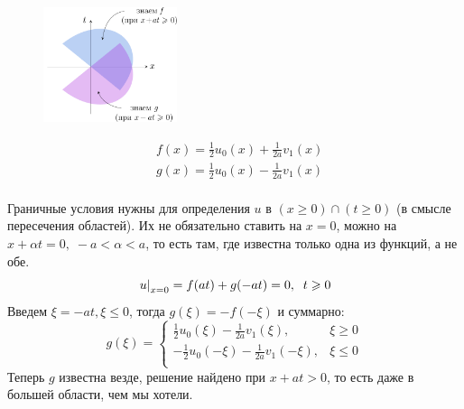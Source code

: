 \documentclass[../main.tex]{subfiles}
\begin{document}
\begin{figure}
    \centering
    \includegraphics[width=0.35\textwidth]{pic 4.pdf}
\end{figure}

\begin{align*}
    & f(x) = \frac{1}{2}u_0(x) + \frac{1}{2a}v_1(x) \\
    & g(x) = \frac{1}{2}u_0(x) - \frac{1}{2a}v_1(x) \\
\end{align*}

Граничные условия нужны для определения $u$ в $(x \geq 0)\cap(t \geq 0)$ (в смысле пересечения областей). Их не обязательно ставить на $x=0$, можно на $x + \alpha t = 0, \; -a < \alpha < a$, то есть там, где известна только одна из функций, а не обе.
$$
\left. u\right|_{x=0} = f(at) + g(-at)=0, \;\; t \geqslant 0
$$
\clearpage %
Введем $\xi = -at, \xi \leq 0$, тогда $g(\xi) = -f(-\xi)$ и суммарно:
\begin{equation*}
    g(\xi) = \begin{cases}
        \frac{1}{2}u_0(\xi)-\frac{1}{2a}v_1(\xi), & \xi \geq 0\\
        -\frac{1}{2}u_0(-\xi)-\frac{1}{2a}v_1(-\xi), & \xi \leq 0\\
    \end{cases}
\end{equation*}
Теперь $g$ известна везде, решение найдено при $x + at > 0$, то есть даже в большей области, чем мы хотели.

\begin{center}
\end{center}
\end{document}
